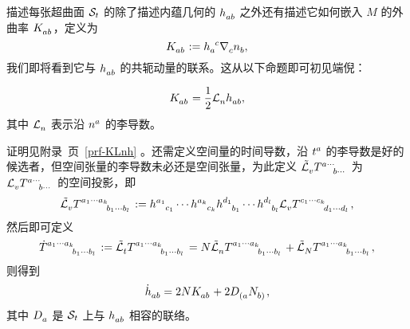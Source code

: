 		描述每张超曲面 $\mathcal{S}_t$ 的除了描述内蕴几何的 $\tensor{h}{_a_b}$ 之外还有描述它如何嵌入 $M$ 的外曲率 $\tensor{K}{_a_b}$，定义为
		\begin{equation}
			\tensor{K}{_a_b} \definedby \tensor{h}{_a^c} \Nabla{c} \tensor{n}{_b},
		\end{equation}
		我们即将看到它与 $\tensor{h}{_a_b}$ 的共轭动量的联系。这从以下命题即可初见端倪：
		\begin{Property}
			\label{pro-KLnh}
			\begin{equation}
				\tensor{K}{_a_b} = \frac{1}{2} \Ld{n} \tensor{h}{_a_b},
			\end{equation}
			其中 $\Ld{n}$ 表示沿 $\tensor{n}{^a}$ 的李导数。
		\end{Property}
		证明见附录~\pageref{prf-KLnh}页~\ref{prf-KLnh}
		。还需定义空间量的时间导数，沿 $\tensor{t}{^a}$ 的李导数是好的候选者，但空间张量的李导数未必还是空间张量，为此定义 $\spaceLd{v} \tensor{T}{^{a\cdots}_{b \cdots}}$ 为 $\Ld{v} \tensor{T}{^{a\cdots}_{b \cdots}}$ 的空间投影，即
		\begin{equation}
			\spaceLd{v} \tensor{T}{^{a_1 \cdots a_k}_{b_1 \cdots b_l}} \definedby \tensor{h}{^{a_1}_{c_1}} \cdots \tensor{h}{^{a_k}_{c_k}} \tensor{h}{^{d_1}_{b_1}} \cdots \tensor{h}{^{d_l}_{b_l}} \Ld{v} \tensor{T}{^{c_1 \cdots c_k}_{d_1 \cdots d_l}}, \label{eq-spaceLd}
		\end{equation}
		然后即可定义
		\begin{equation}
			\tensor{\dot{T}}{^{a_1 \cdots a_k}_{b_1 \cdots b_l}} \definedby \spaceLd{t} \tensor{T}{^{a_1 \cdots a_k}_{b_1 \cdots b_l}} = N \spaceLd{n} \tensor{T}{^{a_1 \cdots a_k}_{b_1 \cdots b_l}} + \spaceLd{N} \tensor{T}{^{a_1 \cdots a_k}_{b_1 \cdots b_l}}, \label{eq-timedot}
		\end{equation}
		则得到
		\begin{equation}
			\tensor{\dot{h}}{_a_b} = 2N \tensor{K}{_a_b} + 2 \spaceD{{(a}} \tensor{N}{_{b)}},
		\end{equation}
		其中 $\spaceD{a}$ 是 $\mathcal{S}_t$ 上与 $\tensor{h}{_a_b}$ 相容的联络。


